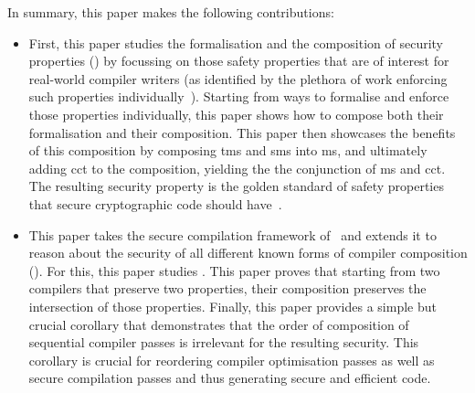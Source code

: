 \documentclass[utf8,acmsmall,review,screen,dvipsnames]{acmart}
\begin{document}
In summary, this paper makes the following contributions:

\begin{itemize}
  \item %
        First, this paper studies the formalisation and the composition of security properties () by focussing on those safety properties that are of interest for real-world compiler writers (as identified by the plethora of work enforcing such properties individually~).
        Starting from ways to formalise and enforce those properties individually, this paper shows how to compose both their formalisation and their composition.
        This paper then showcases the benefits of this composition by composing \gls{tms} and \gls{sms} into \gls{ms}, and ultimately adding \gls{cct} to the composition, yielding the the conjunction of \gls{ms} and \gls{cct}.
        The resulting security property is the golden standard of safety properties that secure cryptographic code should have~.

  \item %
        This paper takes the secure compilation framework of~\citep{abate2019jour} and extends it to reason about the security of all different known forms of compiler composition ().
        For this, this paper studies \MP{}.
        This paper proves that starting from two compilers that preserve two properties, their composition preserves the intersection of those properties.
        Finally, this paper provides a simple but crucial corollary that demonstrates that the order of composition of sequential compiler passes is irrelevant for the resulting security.
        This corollary is crucial for reordering compiler optimisation passes as well as secure compilation passes and thus generating secure and efficient code.


\end{itemize}
\end{document}
